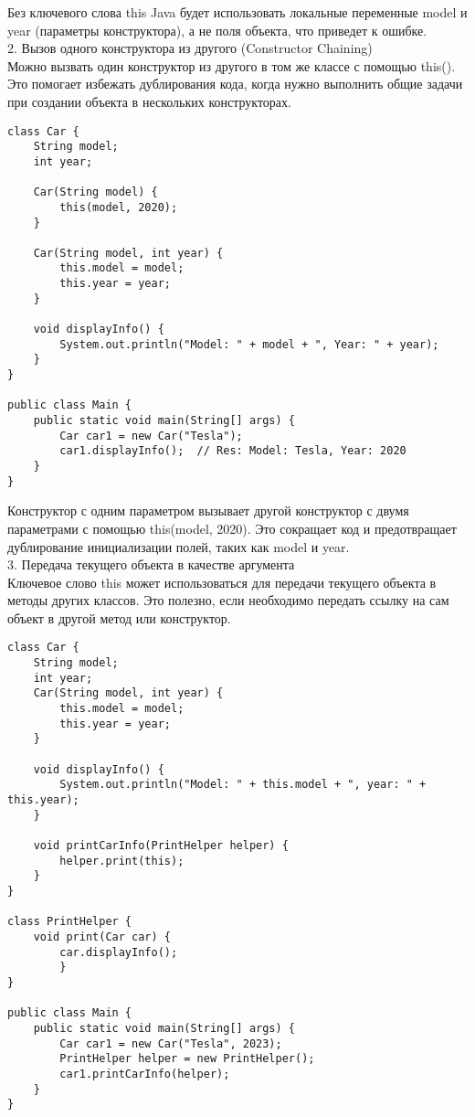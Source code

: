 Без ключевого слова this Java будет использовать локальные переменные model и year (параметры конструктора), а не поля объекта, что приведет к ошибке. \\
2. Вызов одного конструктора из другого (Constructor Chaining) \\
Можно вызвать один конструктор из другого в том же классе с помощью this(). Это помогает избежать дублирования кода, когда нужно выполнить общие задачи при создании объекта в нескольких конструкторах. \\
\begin{lstlisting}
class Car {
    String model;
    int year;
    
    Car(String model) {
        this(model, 2020);  
    }
    
    Car(String model, int year) {
        this.model = model;
        this.year = year;
    }
    
    void displayInfo() {
        System.out.println("Model: " + model + ", Year: " + year);
    }
}

public class Main {
    public static void main(String[] args) {
        Car car1 = new Car("Tesla");
        car1.displayInfo();  // Res: Model: Tesla, Year: 2020
    }
}
\end{lstlisting}
Конструктор с одним параметром вызывает другой конструктор с двумя параметрами с помощью this(model, 2020). Это сокращает код и предотвращает дублирование инициализации полей, таких как model и year. \\
3. Передача текущего объекта в качестве аргумента \\
Ключевое слово this может использоваться для передачи текущего объекта в методы других классов. Это полезно, если необходимо передать ссылку на сам объект в другой метод или конструктор. \\
\begin{lstlisting}
class Car {
    String model;
    int year;
    Car(String model, int year) {
        this.model = model; 
        this.year = year;   
    }

    void displayInfo() {
        System.out.println("Model: " + this.model + ", year: " + this.year);
    }

    void printCarInfo(PrintHelper helper) {
        helper.print(this);  
    }
}

class PrintHelper {
    void print(Car car) {
        car.displayInfo();  
        }
}

public class Main {
    public static void main(String[] args) {
        Car car1 = new Car("Tesla", 2023);
        PrintHelper helper = new PrintHelper();
        car1.printCarInfo(helper);
    }
}

\end{lstlisting}
